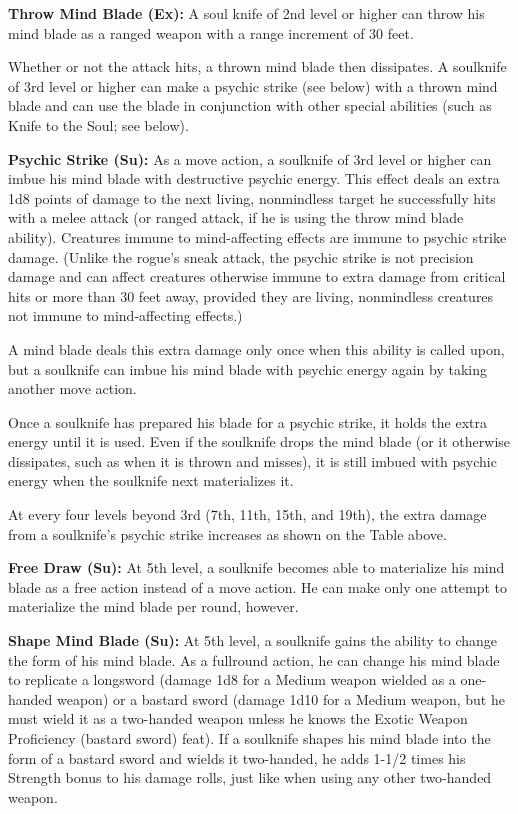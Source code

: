 \documentclass{article}
\begin{document}
\textbf{Throw Mind Blade (Ex):} A soul knife of 2nd level or higher can throw his 
mind blade as a ranged weapon with a range increment of 30 feet.

Whether or not the attack hits, a thrown mind blade then dissipates. A soulknife 
of 3rd level or higher can make a psychic strike (see below) with a thrown mind 
blade and can use the blade in conjunction with other special abilities (such as 
Knife to the Soul; see below).

\textbf{Psychic Strike (Su):} As a move action, a soulknife of 3rd level or higher 
can imbue his mind blade with destructive psychic energy. This effect deals an 
extra 1d8 points of damage to the next living, nonmindless target he successfully 
hits with a melee attack (or ranged attack, if he is using the throw mind blade 
ability). Creatures immune to mind-affecting effects are immune to psychic strike 
damage. (Unlike the rogue's sneak attack, the psychic strike is not precision damage 
and can affect creatures otherwise immune to extra damage from critical hits or 
more than 30 feet away, provided they are living, nonmindless creatures not immune 
to mind-affecting effects.)

A mind blade deals this extra damage only once when this ability is called upon, 
but a soulknife can imbue his mind blade with psychic energy again by taking another 
move action.

Once a soulknife has prepared his blade for a psychic strike, it holds the extra 
energy until it is used. Even if the soulknife drops the mind blade (or it otherwise 
dissipates, such as when it is thrown and misses), it is still imbued with psychic 
energy when the soulknife next materializes it.

At every four levels beyond 3rd (7th, 11th, 15th, and 19th), the extra damage from 
a soulknife's psychic strike increases as shown on the Table above.

\textbf{Free Draw (Su):} At 5th level, a soulknife becomes able to materialize 
his mind blade as a free action instead of a move action. He can make only one 
attempt to materialize the mind blade per round, however.

\textbf{Shape Mind Blade (Su):} At 5th level, a soulknife gains the ability to 
change the form of his mind blade. As a fullround action, he can change his mind 
blade to replicate a longsword (damage 1d8 for a Medium weapon wielded as a one-handed 
weapon) or a bastard sword (damage 1d10 for a Medium weapon, but he must wield 
it as a two-handed weapon unless he knows the Exotic Weapon Proficiency (bastard 
sword) feat). If a soulknife shapes his mind blade into the form of a bastard sword 
and wields it two-handed, he adds 1-1/2 times his Strength bonus to his damage 
rolls, just like when using any other two-handed weapon.
\end{document}
